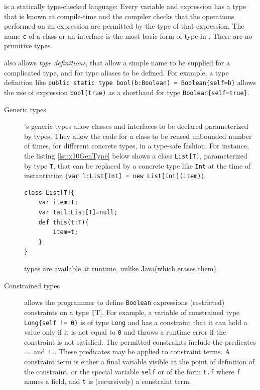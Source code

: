 \xten is a statically type-checked language: Every variable and expression has 
a type that is known at compile-time and the compiler checks that the operations
performed on an expression are permitted by the type of that expression. 
The name \texttt{c} of a class or an interface is the most basic form of type in
\xten. There are no primitive types. 

\xten also allows \emph{type definitions}, that allow a simple name to be
supplied for a complicated type, and for type aliases to be defined. For
example, a type definition like \texttt{public static type bool(b:Boolean) =
Boolean\{self=b\}} allows the use of expression \texttt{bool(true)} as a
shorthand for type \texttt{Boolean\{self=true\}}.

\begin{description}

\item[Generic types] \xten's generic types allow classes and interfaces to be
declared parameterized by types. They allow the code for a class to be reused
unbounded number of times, for different concrete types, in a type-safe fashion. 
For instance, the listing \ref{lst:x10GenType} below shows a class 
\texttt{List[T]}, parameterized by
type \texttt{T}, that can be replaced by a concrete type like \texttt{Int} at
the time of instantiation (\texttt{var l:List[Int] = new List[Int](item)}).
\begin{lstlisting}[caption={},label={lst:x10GenType},language=x10,numbers=none]
class List[T]{
	var item:T;
	var tail:List[T]=null;
	def this(t:T){
		item=t;
	}
}
\end{lstlisting}
\xten types are available at runtime, unlike Java(which erases them). 

\item[Constrained types] \xten allows the programmer to define \texttt{Boolean}
expressions (restricted) constraints on a type \texttt[T]. For example, a
variable of constrained type \texttt{Long\{self != 0\}} is of type \texttt{Long}
and has a constraint that it can hold a value only if it is not equal to
\texttt{0} and throws a runtime error if the constraint is not
satisfied. The permitted constraints include the predicates \texttt{==} and
\texttt{!=}. These
predicates may be applied to constraint terms. A constraint term is either a
final variable visible at the point of definition of the constraint, or the
special variable \texttt{self} or of the form \texttt{t.f} where \texttt{f} 
names a field, and \texttt{t} is
(recursively) a constraint term.  

\end{description} 

